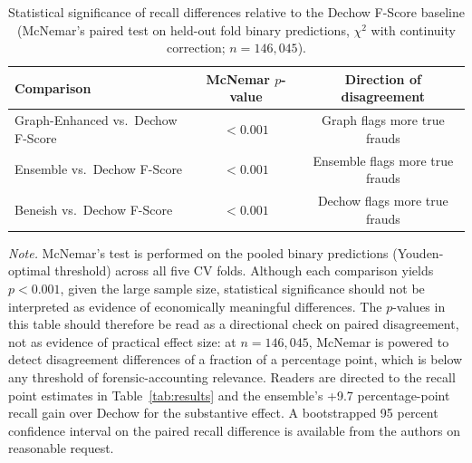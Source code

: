 \documentclass[12pt]{article}
\begin{document}
\begin{table}[tbp]
\centering
\caption{Statistical significance of recall differences relative
         to the Dechow F-Score baseline (McNemar's paired test on held-out
         fold binary predictions, $\chi^2$ with continuity correction;
         $n = 146{,}045$).}
\label{tab:mcnemar}
\small
\begin{tabular}{lcc}
\toprule
\textbf{Comparison} & \textbf{McNemar $p$-value} & \textbf{Direction of disagreement} \\
\midrule
Graph-Enhanced vs.\ Dechow F-Score & $< 0.001$ & Graph flags more true frauds \\
Ensemble vs.\ Dechow F-Score       & $< 0.001$ & Ensemble flags more true frauds \\
Beneish vs.\ Dechow F-Score        & $< 0.001$ & Dechow flags more true frauds \\
\bottomrule
\end{tabular}
\end{table}

\noindent\textit{Note.}
McNemar's test is performed on the pooled binary predictions
(Youden-optimal threshold) across all five CV folds.  Although each
comparison yields $p < 0.001$, given the large sample size, statistical
significance should not be interpreted as evidence of economically
meaningful differences.  The $p$-values in this table should therefore
be read as a directional check on paired disagreement, not as evidence
of practical effect size: at $n = 146{,}045$, McNemar is powered to
detect disagreement differences of a fraction of a percentage point,
which is below any threshold of forensic-accounting relevance.  Readers
are directed to the recall point estimates in Table~\ref{tab:results} and
the ensemble's +9.7 percentage-point recall gain over Dechow for the
substantive effect.  A bootstrapped 95 percent confidence interval on the
paired recall difference is available from the authors on reasonable
request.
\end{document}
